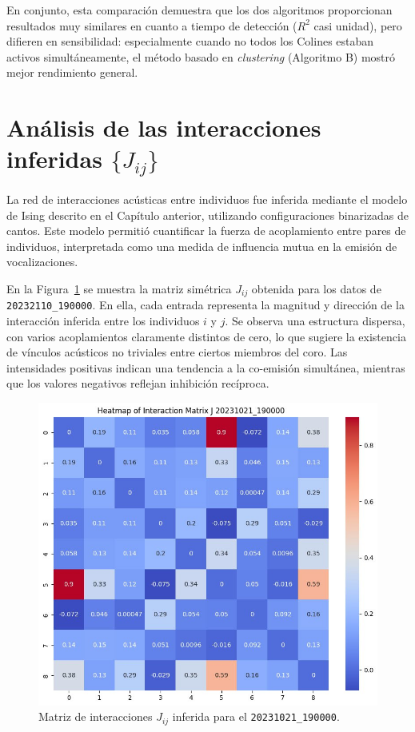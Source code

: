 En conjunto, esta comparación demuestra que los dos algoritmos 
proporcionan resultados muy similares en cuanto a tiempo de 
detección (\(R^2\) casi unidad), pero difieren en sensibilidad: 
especialmente cuando no todos los Colines 
estaban activos simultáneamente, el método basado en \textit{clustering} 
(Algoritmo B) mostró mejor rendimiento general.



\section{Análisis de las interacciones inferidas \(\{J_{ij}\}\)}
\label{sec:res_interacciones}


La red de interacciones acústicas entre individuos fue inferida 
mediante el modelo de Ising descrito en el Capítulo anterior, 
utilizando configuraciones binarizadas de cantos. 
Este modelo permitió 
cuantificar la fuerza de acoplamiento entre pares de individuos, 
interpretada como una medida de influencia mutua en la emisión 
de vocalizaciones. 

En la Figura~\ref{fig:jij} se muestra la matriz simétrica 
\( J_{ij} \) obtenida para los datos de \texttt{20232110\_190000}. 
En ella, cada entrada 
representa la magnitud y dirección de la interacción inferida 
entre los individuos \( i \) y \( j \). Se observa una 
estructura dispersa, con varios acoplamientos claramente 
distintos de cero, lo que sugiere la existencia de vínculos 
acústicos no triviales entre ciertos miembros del coro. Las 
intensidades positivas indican una tendencia a la co-emisión 
simultánea, mientras que los valores negativos reflejan 
inhibición recíproca.

\begin{figure}[htbp]
    \centering
    \includegraphics[width=0.7\linewidth]{Graphics/matrix_jij.jpg}
    \caption{Matriz de interacciones \( J_{ij} \) inferida para el \texttt{20231021\_190000}.}
    \label{fig:jij}
\end{figure}


